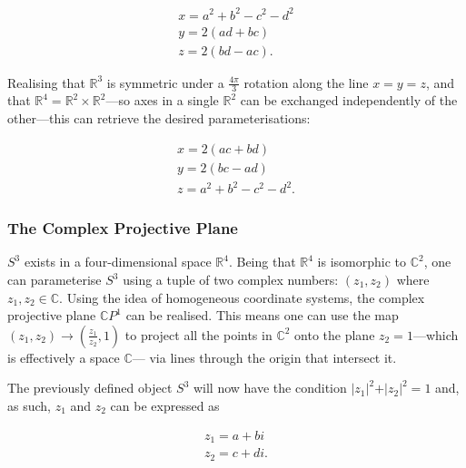 \documentclass[fleqn, twocolumn, 10pt]{article}
\begin{document}
\begin{ceqn}
\begin{align*}
x = a^2 + b^2 - c^2 - d^2\\
y = 2(ad + bc)\;\;\;\;\;\;\\
z = 2(bd-ac).\;\;\;\;\;
\end{align*}
\end{ceqn}
Realising that $\mathbb{R}^3$ is symmetric under a $\frac{4\pi}{3}$ rotation along the line $x = y = z$, and that $\mathbb{R}^4 = \mathbb{R}^2 \times \mathbb{R}^2$---so axes in a single $\mathbb{R}^2$ can be exchanged independently of the other---this can retrieve the desired parameterisations:

\begin{ceqn}
\begin{align*}
x = 2(ac + bd)\;\;\;\;\;\;\\
y = 2(bc-ad)\;\;\;\;\;\;\\
z = a^2 + b^2 - c^2 - d^2.
\end{align*}
\end{ceqn}


\subsubsection{The Complex Projective Plane}

$S^3$ exists in a four-dimensional space $\mathbb{R}^4$. Being that $\mathbb{R}^4$ is isomorphic to $\mathbb{C}^2$, one can parameterise $S^3$ using a tuple of two complex numbers: $(z_1,z_2)$ where $z_1, z_2 \in \mathbb{C}$. Using the idea of homogeneous coordinate systems, the complex projective plane $\mathbb{C}P^1$ can be realised. This means one can use the map $(z_1,z_2) \to (\frac{z_1}{z_2},1)$ to project all the points in $\mathbb{C}^2$ onto the plane $z_2=1$---which is effectively a space $\mathbb{C}$--- via lines through the origin that intersect it.

The previously defined object $S^3$ will now have the condition $\rvert z_1\rvert^2 + \rvert z_2\rvert^2 = 1$ and, as such, $z_1$ and $z_2$ can be expressed as \cite{shnir, niles2011hopf, scaletta2010hopf}
 
\begin{ceqn}
\begin{align*}
z_1 = a + bi\;\\
z_2 = c + di.
\end{align*}
\end{ceqn}
\end{document}
